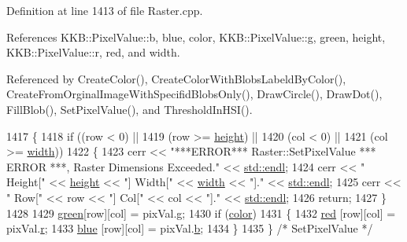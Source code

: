 Definition at line 1413 of file Raster.\+cpp.



References K\+K\+B\+::\+Pixel\+Value\+::b, blue, color, K\+K\+B\+::\+Pixel\+Value\+::g, green, height, K\+K\+B\+::\+Pixel\+Value\+::r, red, and width.



Referenced by Create\+Color(), Create\+Color\+With\+Blobs\+Labeld\+By\+Color(), Create\+From\+Orginal\+Image\+With\+Specifid\+Blobs\+Only(), Draw\+Circle(), Draw\+Dot(), Fill\+Blob(), Set\+Pixel\+Value(), and Threshold\+In\+H\+S\+I().


\begin{DoxyCode}
1417 \{
1418   \textcolor{keywordflow}{if}  ((row <  0)      ||  
1419        (row >= \hyperlink{class_k_k_b_1_1_raster_af39ff189de4fbb6de98392e187efafb7}{height}) ||
1420        (col <  0)      ||
1421        (col >= \hyperlink{class_k_k_b_1_1_raster_ae0bcc103e191c3421d7692dc69ceb554}{width}))
1422   \{
1423     cerr << \textcolor{stringliteral}{"***ERROR*** Raster::SetPixelValue   *** ERROR ***,  Raster Dimensions Exceeded."}       << 
      \hyperlink{namespace_k_k_b_ad1f50f65af6adc8fa9e6f62d007818a8}{std::endl};
1424     cerr << \textcolor{stringliteral}{"                        Height["} << \hyperlink{class_k_k_b_1_1_raster_af39ff189de4fbb6de98392e187efafb7}{height} << \textcolor{stringliteral}{"]  Width["} << 
      \hyperlink{class_k_k_b_1_1_raster_ae0bcc103e191c3421d7692dc69ceb554}{width} << \textcolor{stringliteral}{"]."} << \hyperlink{namespace_k_k_b_ad1f50f65af6adc8fa9e6f62d007818a8}{std::endl};
1425     cerr << \textcolor{stringliteral}{"                        Row["}    << row    << \textcolor{stringliteral}{"]  Col["}   << col   << \textcolor{stringliteral}{"]."} << 
      \hyperlink{namespace_k_k_b_ad1f50f65af6adc8fa9e6f62d007818a8}{std::endl};
1426     \textcolor{keywordflow}{return};
1427   \}
1428 
1429   \hyperlink{class_k_k_b_1_1_raster_a2d2238911145488e226cd2e34fc8448c}{green}[row][col] = pixVal.\hyperlink{class_k_k_b_1_1_pixel_value_ab9b7056f3cf6f67a5987a8119ceaab67}{g};
1430   \textcolor{keywordflow}{if}  (\hyperlink{class_k_k_b_1_1_raster_a482384d89cc53fa4f36276307c746854}{color})
1431   \{
1432     \hyperlink{class_k_k_b_1_1_raster_a7fd39e0463c8477d0d0d26e11126d285}{red}  [row][col] = pixVal.\hyperlink{class_k_k_b_1_1_pixel_value_a734e16b4afd9a270df67aa1ce726e2d0}{r};
1433     \hyperlink{class_k_k_b_1_1_raster_a0265be7ea30f5b1f9d6310a79bee868b}{blue} [row][col] = pixVal.\hyperlink{class_k_k_b_1_1_pixel_value_ac43e49760f71b756dba6c40e80e7917a}{b};
1434   \}
1435 \}  \textcolor{comment}{/* SetPixelValue  */}
\end{DoxyCode}

